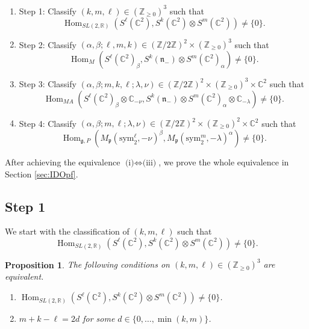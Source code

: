 \documentclass[reqno,11pt]{amsart}
\newtheorem{prop}[equation]{Proposition}
\theoremstyle{remark}
\numberwithin{equation}{section}
\newcommand{\gb}{\beta}
\newcommand{\ga}{\alpha}
\newcommand{\fg}{{\mathfrak g}}
\newcommand{\fn}{{\mathfrak n}}
\newcommand{\fp}{{\mathfrak p}}
\newcommand{\R}{\mathbb{R}}
\newcommand{\C}{\mathbb{C}}
\newcommand{\Z}{\mathbb{Z}}
\newcommand{\Hom}{\operatorname{Hom}}
\newcommand{\sym}{\mathrm{sym}}
\begin{document}
\begin{enumerate}

\item[]
Step 1:
Classify  $(k, m, \ell) \in (\Z_{\geq 0})^3$ such that
\begin{equation*}
\Hom_{SL(2,\R)}(S^\ell(\C^2), S^k(\C^2)\otimes S^m(\C^2))\neq \{0\}.
\end{equation*}

\item[]
Step 2: 
Classify
$(\alpha,\beta;\ell,m,k) \in (\Z/2\Z)^2 \times (\Z_{\geq 0})^3$ such that
\begin{equation*}
\Hom_{M}(S^\ell(\C^2)_\beta, S^k(\fn_-)\otimes S^m(\C^2)_\alpha) \neq \{0\}.
\end{equation*}

\item[]
Step 3:
Classify
$(\alpha, \beta; m, k, \ell; \lambda,\nu)  \in 
(\Z/2\Z)^2 \times (\Z_{\geq 0})^3 \times \C^2$ such that
\begin{equation*}
\Hom_{MA}(S^\ell(\C^2)_\beta \otimes \C_{-\nu}, 
S^k(\fn_-)\otimes S^m(\C^2)_\ga\otimes \C_{-\lambda})\neq \{0\}.
\end{equation*}

\item[]
Step 4: 
Classify $(\ga, \gb; m, \ell; \lambda, \nu) 
\in (\Z/2\Z)^2 \times (\Z_{\geq 0})^2 \times \C^2$ such that
\begin{equation*}
\Hom_{\fg, P}(M_\fp(\sym_2^\ell,-\nu)^\beta, M_\fp(\sym_2^m, -\lambda)^\alpha) \neq \{0\}.
\end{equation*}

\end{enumerate}

After achieving the equivalence $\text{(i)}\Leftrightarrow \text{(iii)}$,
we prove the whole equivalence in Section \ref{sec:IDOpf}.


\subsection{Step 1}
We start with the classification of $(k, m, \ell)$ such that
\begin{equation*}
\Hom_{SL(2,\R)}(S^\ell(\C^2), S^k(\C^2)\otimes S^m(\C^2))\neq \{0\}.
\end{equation*}

\begin{prop}\label{prop:Step1}
The following conditions on $(k, m, \ell) \in  (\Z_{\geq 0})^3$ are equivalent.
\begin{enumerate}
\item[\emph{(i)}] $\Hom_{SL(2,\R)}(S^\ell(\C^2), S^k(\C^2)\otimes S^m(\C^2))\neq \{0\}$.
\item[\emph{(ii)}] $m+k-\ell=2d$ for some $d \in \{0,\ldots, \min(k,m)\}$.
\end{enumerate}
\end{prop}
\end{document}
